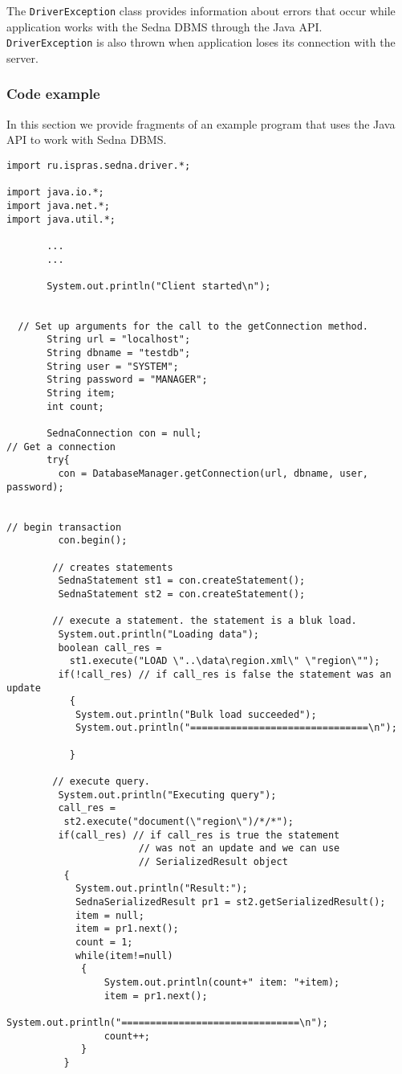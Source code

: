 \documentclass[a4paper,12pt]{article}
\begin{document}
The \verb!DriverException! class provides information about errors that occur while application works with the Sedna DBMS through the Java API. \verb!DriverException! is also thrown when application loses its connection with the server.


\subsubsection{Code example}
In this section we provide fragments of an example program that uses the Java API to work with Sedna DBMS.

\small{
\begin{verbatim}
import ru.ispras.sedna.driver.*;

import java.io.*;
import java.net.*;
import java.util.*;

       ...
       ...

	   System.out.println("Client started\n");


  // Set up arguments for the call to the getConnection method.
       String url = "localhost";
       String dbname = "testdb";
       String user = "SYSTEM";
       String password = "MANAGER";
       String item;
       int count;

       SednaConnection con = null;
// Get a connection
       try{
         con = DatabaseManager.getConnection(url, dbname, user, password);


// begin transaction
         con.begin();

        // creates statements
         SednaStatement st1 = con.createStatement();
         SednaStatement st2 = con.createStatement();

        // execute a statement. the statement is a bluk load.
         System.out.println("Loading data");
         boolean call_res =
           st1.execute("LOAD \"..\data\region.xml\" \"region\"");
         if(!call_res) // if call_res is false the statement was an update
           {
            System.out.println("Bulk load succeeded");
            System.out.println("===============================\n");

           }

        // execute query.
         System.out.println("Executing query");
         call_res =
          st2.execute("document(\"region\")/*/*");
         if(call_res) // if call_res is true the statement
                       // was not an update and we can use
                       // SerializedResult object
          {
          	System.out.println("Result:");
            SednaSerializedResult pr1 = st2.getSerializedResult();
            item = null;
            item = pr1.next();
            count = 1;
            while(item!=null)
             {
                 System.out.println(count+" item: "+item);
                 item = pr1.next();
                 System.out.println("===============================\n");
                 count++;
             }
          }


\end{verbatim}}
\end{document}
